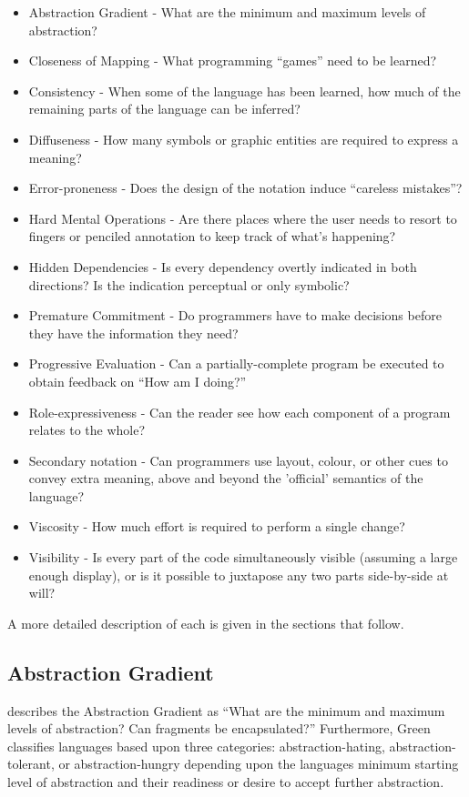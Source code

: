 \begin{itemize}
	\item Abstraction Gradient - What are the minimum and maximum levels of abstraction?
	\item Closeness of Mapping - What programming ``games''	need to be learned?
	\item Consistency - When some of the language has been learned, how much of the remaining parts of the language can be inferred?
	\item Diffuseness - How many symbols or graphic entities are required to express a meaning?
	\item Error-proneness - Does the design of the notation induce ``careless mistakes''?
	\item Hard Mental Operations - Are there places where the user needs to resort to fingers or penciled annotation to keep track of what's happening?
	\item Hidden Dependencies - Is every dependency overtly indicated in both directions? Is the indication perceptual or only symbolic?
	\item Premature Commitment - Do programmers have to make decisions before they have the information they need?
	\item Progressive Evaluation - Can a partially-complete program be executed to obtain feedback on ``How am I doing?''
	\item Role-expressiveness - Can the reader see how each component of a program relates to the whole?
	\item Secondary notation - Can programmers use layout, colour, or other cues to convey extra meaning, above and beyond the 'official' semantics of the language?
	\item Viscosity - How much effort is required to perform a single change?
	\item Visibility - Is every part of the code simultaneously visible (assuming a large enough display), or is it possible to juxtapose any two parts side-by-side at will?
\end{itemize}

A more detailed description of each is given in the sections that follow.

\subsection{Abstraction Gradient}
\label{absgradientoutline}

\cite{green96} describes the Abstraction Gradient as ``What are the minimum and maximum levels of abstraction?  Can 
fragments be encapsulated?''  Furthermore, Green classifies languages based upon three categories: abstraction-hating, 
abstraction-tolerant, or abstraction-hungry depending upon the languages minimum starting level of abstraction and their 
readiness or desire to accept further abstraction.

